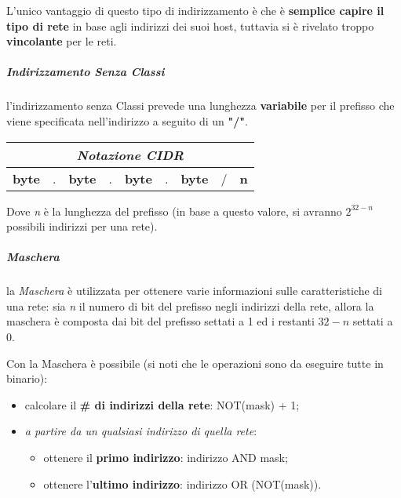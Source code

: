 \documentclass[a4paper]{article}
\begin{document}
						L'unico vantaggio di questo tipo di indirizzamento è che è \textbf{semplice capire il tipo di rete} in base agli indirizzi dei suoi host, tuttavia si è rivelato troppo \textbf{vincolante} per le reti.
						
	 				\subparagraph{Indirizzamento Senza Classi}
	 					l'indirizzamento senza Classi prevede una lunghezza \textbf{variabile} per il prefisso che viene specificata nell'indirizzo a seguito di un \textbf{"/"}.
	 					\begin{center}
		 					\begin{tabular}{ccccccccc}
		 						\multicolumn{9}{c}{\emph{Notazione CIDR}} \\
	 							\hline
								\textbf{byte} & . & \textbf{byte} & . & \textbf{byte} & . & \textbf{byte} & / & \textbf{n}
	 						\end{tabular}
	 					\end{center}
						
						Dove \emph{n} è la lunghezza del prefisso (in base a questo valore, si avranno $ 2^{32 - n} $ possibili indirizzi per una rete).
						
					\newpage					
					
					\subparagraph{Maschera}
						la \emph{Maschera} è utilizzata per ottenere varie informazioni sulle caratteristiche di una rete: sia \emph{n} il numero di bit del prefisso negli indirizzi della rete, allora la maschera è composta dai bit del prefisso settati a 1 ed i restanti $ 32 - n $ settati a 0.
						
						Con la Maschera è possibile (si noti che le operazioni sono da eseguire tutte in binario):
						\begin{itemize}
							\item calcolare il \textbf{\# di indirizzi della rete}: NOT(mask) + 1;
							\item \emph{a partire da un qualsiasi indirizzo di quella rete}:
							\begin{itemize}
								\item ottenere il \textbf{primo indirizzo}: indirizzo AND mask;
								\item ottenere l'\textbf{ultimo indirizzo}: indirizzo OR (NOT(mask)).
							\end{itemize}
						\end{itemize}
						
\end{document}
